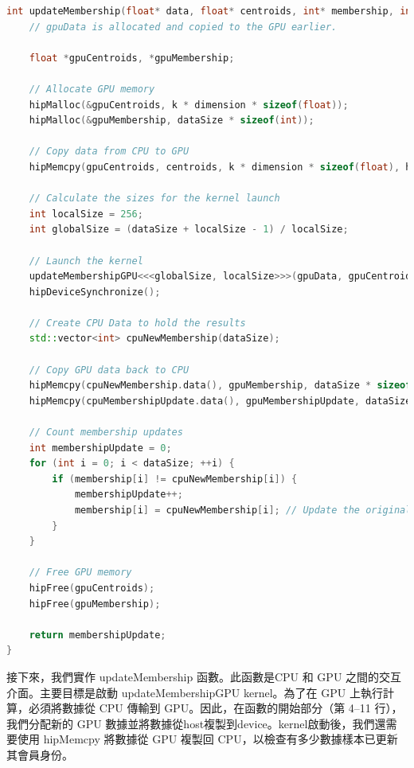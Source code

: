 \lstset{style=mystyle}
\begin{lstlisting}[language=c++,caption={列表 5.12：KMeans 的更新會員函數，使用 GPU 加速計算}]
int updateMembership(float* data, float* centroids, int* membership, int dataSize, int dimension, int k) {
    // gpuData is allocated and copied to the GPU earlier.

    float *gpuCentroids, *gpuMembership;

    // Allocate GPU memory
    hipMalloc(&gpuCentroids, k * dimension * sizeof(float));
    hipMalloc(&gpuMembership, dataSize * sizeof(int));

    // Copy data from CPU to GPU
    hipMemcpy(gpuCentroids, centroids, k * dimension * sizeof(float), hipMemcpyHostToDevice);

    // Calculate the sizes for the kernel launch
    int localSize = 256;
    int globalSize = (dataSize + localSize - 1) / localSize;

    // Launch the kernel
    updateMembershipGPU<<<globalSize, localSize>>>(gpuData, gpuCentroids, gpuMembership, dataSize, dimension, k);
    hipDeviceSynchronize();

    // Create CPU Data to hold the results
    std::vector<int> cpuNewMembership(dataSize);

    // Copy GPU data back to CPU
    hipMemcpy(cpuNewMembership.data(), gpuMembership, dataSize * sizeof(int), hipMemcpyDeviceToHost);
    hipMemcpy(cpuMembershipUpdate.data(), gpuMembershipUpdate, dataSize * sizeof(float), hipMemcpyDeviceToHost);

    // Count membership updates
    int membershipUpdate = 0;
    for (int i = 0; i < dataSize; ++i) {
        if (membership[i] != cpuNewMembership[i]) {
            membershipUpdate++;
            membership[i] = cpuNewMembership[i]; // Update the original membership array
        }
    }

    // Free GPU memory
    hipFree(gpuCentroids);
    hipFree(gpuMembership);

    return membershipUpdate;
}
\end{lstlisting}

\vspace{1em}
接下來，我們實作 updateMembership 函數。此函數是CPU 和 GPU 之間的交互介面。主要目標是啟動 updateMembershipGPU kernel。為了在 GPU 上執行計算，必須將數據從 CPU 傳輸到 GPU。因此，在函數的開始部分（第 4–11 行），我們分配新的 GPU 數據並將數據從host複製到device。kernel啟動後，我們還需要使用 hipMemcpy 將數據從 GPU 複製回 CPU，以檢查有多少數據樣本已更新其會員身份。

